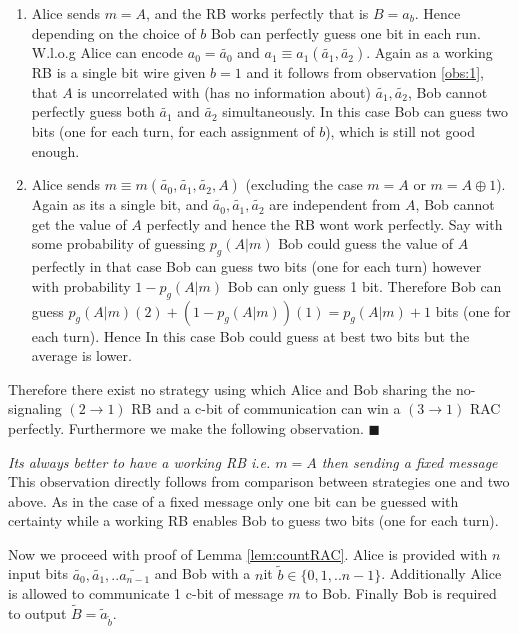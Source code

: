\begin{enumerate}
\item Alice sends $m=A$, and the RB works perfectly that is $B=a_b$. Hence depending on the choice of $b$ Bob can perfectly guess one bit in each run. W.l.o.g Alice can encode $a_0=\tilde{a_0}$ and $a_1\equiv a_1(\tilde{a_1},\tilde{a_2})$. Again as a working RB is a single bit wire given $b=1$ and it follows from observation \ref{obs:1}, that $A$ is uncorrelated with (has no information about) $\tilde{a_1},\tilde{a_2}$, Bob cannot perfectly guess both $\tilde{a_1}$ and $\tilde{a_2}$ simultaneously. In this case Bob can guess two bits (one for each turn, for each assignment of $b$), which is still not good enough.
\item Alice sends $m\equiv m(\tilde{a_0},\tilde{a_1},\tilde{a_2},A)$ (excluding the case $m=A$ or $m=A\oplus 1$).
Again as its a single bit, and $\tilde{a_0},\tilde{a_1},\tilde{a_2}$ are independent from $A$, Bob cannot get the value of $A$ perfectly and hence the RB wont work perfectly. Say with some probability of guessing $p_g(A|m)$ Bob could guess the value of $A$ perfectly in that case Bob can guess two bits (one for each turn) however with probability $1-p_g(A|m)$ Bob can only guess 1 bit. Therefore Bob can guess $p_g(A|m)(2) + (1-p_g(A|m))(1)=p_g(A|m)+1$ bits (one for each turn). Hence In this case Bob could guess at best two bits but the average is lower. 
 
\end{enumerate}
Therefore there exist no strategy using which Alice and Bob sharing the no-signaling $(2 \rightarrow 1)$ RB and a c-bit of communication can win a $(3\rightarrow 1)$ RAC perfectly. Furthermore we make the following observation. $\blacksquare$
\begin{mydef4}\label{obs:2}
\textit{Its always better to have a working RB i.e. $m=A$ then sending a fixed message } \\
This observation directly follows from comparison between strategies one and two above. As in the case of a fixed message only one bit can be guessed with certainty while a working RB enables Bob to guess two bits (one for each turn).
\end{mydef4}
Now we proceed with proof of Lemma \ref{lem:countRAC}.
Alice is provided with $n$ input bits $\tilde{a_0},\tilde{a_1},..\tilde{a_{n-1}}$ and Bob with a $n$it $\tilde{b}\in \{0,1,..n-1\}$. Additionally Alice is allowed to communicate 1 c-bit of message $m$ to Bob. Finally Bob is required to output $\tilde{B}=\tilde{a}_{\tilde{b}}$.\\

